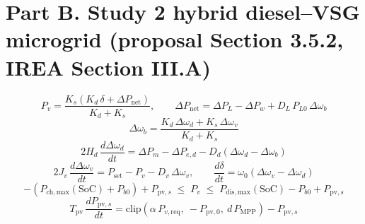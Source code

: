 \documentclass[11pt]{article}
\begin{document}
\section*{Part B. Study 2 hybrid diesel--VSG microgrid (proposal Section 3.5.2, IREA Section III.A)}
\begin{equation}
P_v = \frac{K_s\left(K_d\,\delta + \Delta P_{\mathrm{net}}\right)}{K_d + K_s}, \qquad \Delta P_{\mathrm{net}} = \Delta P_L - \Delta P_w + D_L\,P_{L0}\,\Delta\omega_b \tag{3.12}
\end{equation}
\begin{equation}
\Delta\omega_b = \frac{K_d\,\Delta\omega_d + K_s\,\Delta\omega_v}{K_d + K_s} \tag{3.13}
\end{equation}
\begin{equation}
2H_d\,\frac{d\Delta\omega_d}{dt} = \Delta P_m - \Delta P_{e,d} - D_d\left(\Delta\omega_d - \Delta\omega_b\right) \tag{3.14}
\end{equation}
\begin{equation}
2J_v\,\frac{d\Delta\omega_v}{dt} = P_{\mathrm{set}} - P_v - D_v\,\Delta\omega_v, \qquad \frac{d\delta}{dt} = \omega_0\left(\Delta\omega_v - \Delta\omega_d\right) \tag{3.15}
\end{equation}
\begin{equation}
-\left(P_{\mathrm{ch,max}}(\mathrm{SoC}) + P_{b0}\right) + P_{\mathrm{pv},s} \;\le\; P_v \;\le\; P_{\mathrm{dis,max}}(\mathrm{SoC}) - P_{b0} + P_{\mathrm{pv},s} \tag{3.16}
\end{equation}
\begin{equation}
T_{\mathrm{pv}}\,\frac{dP_{\mathrm{pv},s}}{dt} = \mathrm{clip}\!\left(\alpha\,P_{v,\mathrm{req}},\ -P_{\mathrm{pv},0},\ d\,P_{\mathrm{MPP}}\right) - P_{\mathrm{pv},s} \tag{3.16a}
\end{equation}
\end{document}

